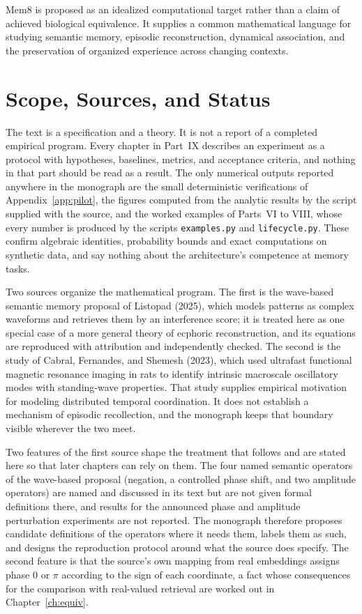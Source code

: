 \documentclass[11pt,twoside,openany]{book}
\theoremstyle{plain}
\theoremstyle{definition}
\theoremstyle{remark}
\theoremstyle{definition}
\begin{document}
Mem8 is proposed as an idealized computational target rather than a claim of achieved biological equivalence. It supplies a common mathematical language for studying semantic memory, episodic reconstruction, dynamical association, and the preservation of organized experience across changing contexts.

\chapter*{Scope, Sources, and Status}

The text is a specification and a theory. It is not a report of a completed empirical program. Every chapter in Part~IX describes an experiment as a protocol with hypotheses, baselines, metrics, and acceptance criteria, and nothing in that part should be read as a result. The only numerical outputs reported anywhere in the monograph are the small deterministic verifications of Appendix~\ref{app:pilot}, the figures computed from the analytic results by the script supplied with the source, and the worked examples of Parts~VI to VIII, whose every number is produced by the scripts \texttt{examples.py} and \texttt{lifecycle.py}. These confirm algebraic identities, probability bounds and exact computations on synthetic data, and say nothing about the architecture's competence at memory tasks.

Two sources organize the mathematical program. The first is the wave-based semantic memory proposal of Listopad (2025), which models patterns as complex waveforms and retrieves them by an interference score; it is treated here as one special case of a more general theory of ecphoric reconstruction, and its equations are reproduced with attribution and independently checked. The second is the study of Cabral, Fernandes, and Shemesh (2023), which used ultrafast functional magnetic resonance imaging in rats to identify intrinsic macroscale oscillatory modes with standing-wave properties. That study supplies empirical motivation for modeling distributed temporal coordination. It does not establish a mechanism of episodic recollection, and the monograph keeps that boundary visible wherever the two meet.

Two features of the first source shape the treatment that follows and are stated here so that later chapters can rely on them. The four named semantic operators of the wave-based proposal (negation, a controlled phase shift, and two amplitude operators) are named and discussed in its text but are not given formal definitions there, and results for the announced phase and amplitude perturbation experiments are not reported. The monograph therefore proposes candidate definitions of the operators where it needs them, labels them as such, and designs the reproduction protocol around what the source does specify. The second feature is that the source's own mapping from real embeddings assigns phase $0$ or $\pi$ according to the sign of each coordinate, a fact whose consequences for the comparison with real-valued retrieval are worked out in Chapter~\ref{ch:equiv}.
\end{document}
